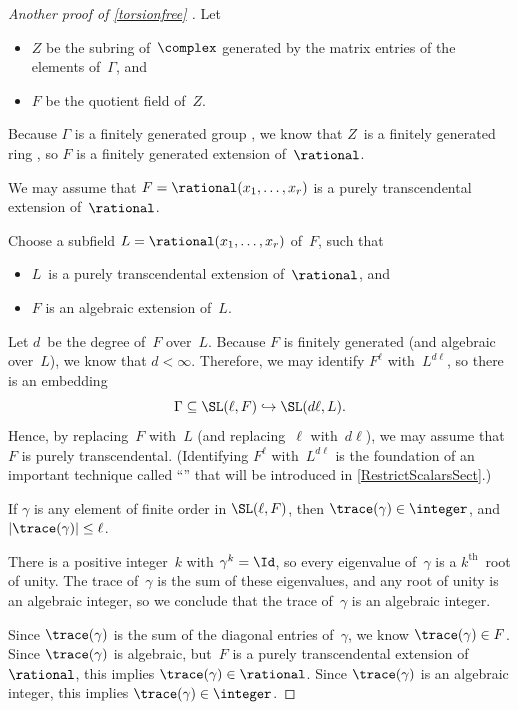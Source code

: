 \begin{proof}[Another proof of \cref{torsionfree} \optional]
 Let 
 \begin{itemize}
 \item $Z$ be the subring of~$\complex$ generated by the
matrix entries of the elements of~$\Gamma$, and
 \item $F$ be the quotient field of~$Z$.
 \end{itemize}
 Because $\Gamma$ is a finitely generated group
, we know that $Z$~is a finitely
generated ring , so $F$ is a
finitely generated extension of~$\rational$.

\setcounter{step}{0}

\begin{step}
 We may assume that $F = \rational(x_1,\ldots,x_r)$ is a
purely transcendental extension of\/~$\rational$.
 \end{step}
 Choose a subfield $L = \rational(x_1,\ldots,x_r)$ of~$F$,
such that 
 \begin{itemize}
 \item $L$~is a purely transcendental extension
of~$\rational$, and 
 \item $F$ is an algebraic extension of~$L$.
 \end{itemize}
 Let $d$~be the degree of~$F$ over~$L$. Because $F$ is
finitely generated (and algebraic over~$L$), we know that
$d < \infty$. Therefore, we may identify $F^\ell$
with~$L^{d\ell}$, so there is an embedding
 $$ \Gamma \subseteq \SL(\ell,F) \hookrightarrow \SL(d\ell,
L) .$$
 Hence, by replacing~$F$ with~$L$ (and replacing~$\ell$
with~$d\ell$), we may assume that $F$ is purely
transcendental.
(Identifying $F^\ell$ with~$L^{d\ell}$ is the foundation of an important technique called ``'' that will be introduced in \cref{RestrictScalarsSect}.)

\begin{step} \label{TorsionAltPf-traces}
 If $\gamma$ is any element of finite order in
$\SL(\ell,F)$, then $\trace(\gamma) \in \integer$, and
$|\trace(\gamma)| \le \ell$.
 \end{step}
 There is a positive integer~$k$ with $\gamma^k = \Id$, so
every eigenvalue of~$\gamma$ is a $k^{\text{th}}$~root of
unity. The trace of~$\gamma$ is the sum of these
eigenvalues, and any root of unity is an algebraic
integer, so we conclude that the trace of~$\gamma$ is an
algebraic integer. 

Since $\trace(\gamma)$ is the sum of the diagonal entries
of~$\gamma$, we know $\trace(\gamma) \in F$.  Since
$\trace(\gamma)$ is algebraic, but~$F$ is a purely
transcendental extension of~$\rational$, this implies
$\trace(\gamma) \in \rational$. Since $\trace(\gamma)$ is
an algebraic integer, this implies $\trace(\gamma) \in
\integer$.


\end{proof}
